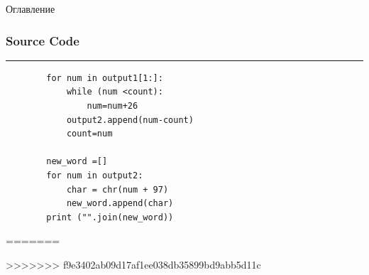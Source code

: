 \documentclass[12pt]{beamer}
\begin{document}
\begin{frame}{Оглавление}
\begin{frame}[fragile]
\end{frame}

\begin{frame}[fragile]
    \frametitle{Source Code}
    \rule{\textwidth}{1pt}
    \scriptsize
    \begin{verbatim}
        for num in output1[1:]:
            while (num <count):
                num=num+26
            output2.append(num-count)
            count=num
            
        new_word =[]    
        for num in output2:
            char = chr(num + 97)
            new_word.append(char)
        print ("".join(new_word))
    \end{verbatim}
    
    
\end{frame}
=======
\end{frame}

>>>>>>> f9e3402ab09d17af1ee038db35899bd9abb5d11c
\end{document}
